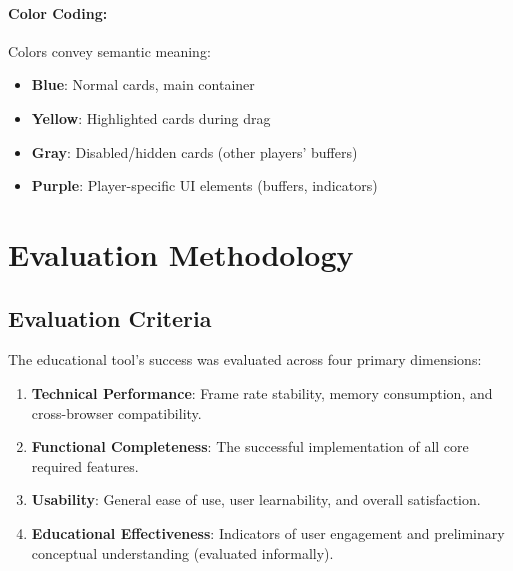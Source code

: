 \paragraph*{Color Coding:}

Colors convey semantic meaning:

\begin{itemize}
    \item \textbf{Blue}: Normal cards, main container
    \item \textbf{Yellow}: Highlighted cards during drag
    \item \textbf{Gray}: Disabled/hidden cards (other players' buffers)
    \item \textbf{Purple}: Player-specific UI elements (buffers, indicators)
\end{itemize}


\section{Evaluation Methodology}
\label{sec:evaluation-methodology}

\subsection{Evaluation Criteria}
\label{subsec:evaluation-criteria}

The educational tool's success was evaluated across four primary dimensions:

\begin{enumerate}
    \item \textbf{Technical Performance}: Frame rate stability, memory consumption, and cross-browser compatibility.
    \item \textbf{Functional Completeness}: The successful implementation of all core required features.
    \item \textbf{Usability}: General ease of use, user learnability, and overall satisfaction.
    \item \textbf{Educational Effectiveness}: Indicators of user engagement and preliminary conceptual understanding (evaluated informally).
\end{enumerate}

